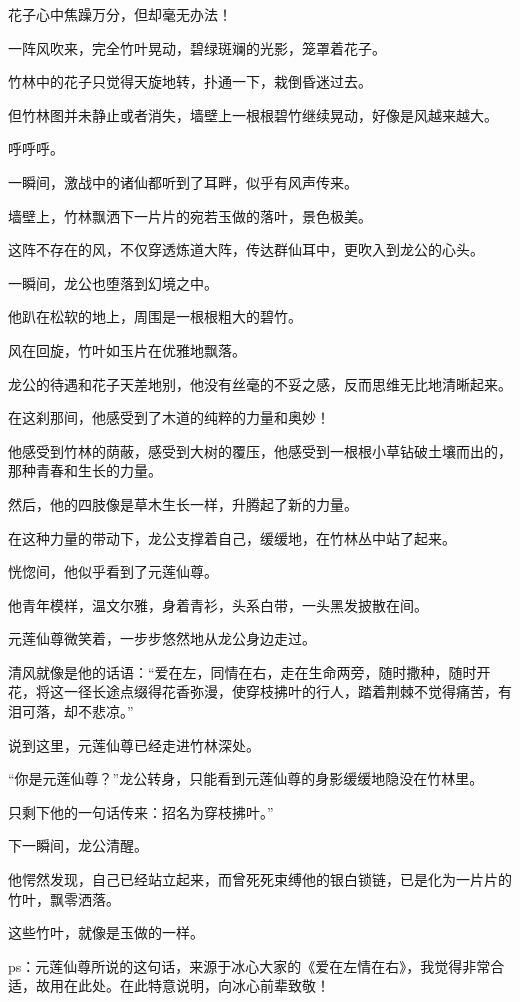 \begin{this_body}
花子心中焦躁万分，但却毫无办法！

一阵风吹来，完全竹叶晃动，碧绿斑斓的光影，笼罩着花子。

竹林中的花子只觉得天旋地转，扑通一下，栽倒昏迷过去。

但竹林图并未静止或者消失，墙壁上一根根碧竹继续晃动，好像是风越来越大。

呼呼呼。

一瞬间，激战中的诸仙都听到了耳畔，似乎有风声传来。

墙壁上，竹林飘洒下一片片的宛若玉做的落叶，景色极美。

这阵不存在的风，不仅穿透炼道大阵，传达群仙耳中，更吹入到龙公的心头。

一瞬间，龙公也堕落到幻境之中。

他趴在松软的地上，周围是一根根粗大的碧竹。

风在回旋，竹叶如玉片在优雅地飘落。

龙公的待遇和花子天差地别，他没有丝毫的不妥之感，反而思维无比地清晰起来。

在这刹那间，他感受到了木道的纯粹的力量和奥妙！

他感受到竹林的荫蔽，感受到大树的覆压，他感受到一根根小草钻破土壤而出的，那种青春和生长的力量。

然后，他的四肢像是草木生长一样，升腾起了新的力量。

在这种力量的带动下，龙公支撑着自己，缓缓地，在竹林丛中站了起来。

恍惚间，他似乎看到了元莲仙尊。

他青年模样，温文尔雅，身着青衫，头系白带，一头黑发披散在间。

元莲仙尊微笑着，一步步悠然地从龙公身边走过。

清风就像是他的话语：“爱在左，同情在右，走在生命两旁，随时撒种，随时开花，将这一径长途点缀得花香弥漫，使穿枝拂叶的行人，踏着荆棘不觉得痛苦，有泪可落，却不悲凉。”

说到这里，元莲仙尊已经走进竹林深处。

“你是元莲仙尊？”龙公转身，只能看到元莲仙尊的身影缓缓地隐没在竹林里。

只剩下他的一句话传来：招名为穿枝拂叶。”

下一瞬间，龙公清醒。

他愕然发现，自己已经站立起来，而曾死死束缚他的银白锁链，已是化为一片片的竹叶，飘零洒落。

这些竹叶，就像是玉做的一样。

ps：元莲仙尊所说的这句话，来源于冰心大家的《爱在左情在右》，我觉得非常合适，故用在此处。在此特意说明，向冰心前辈致敬！

\end{this_body}

